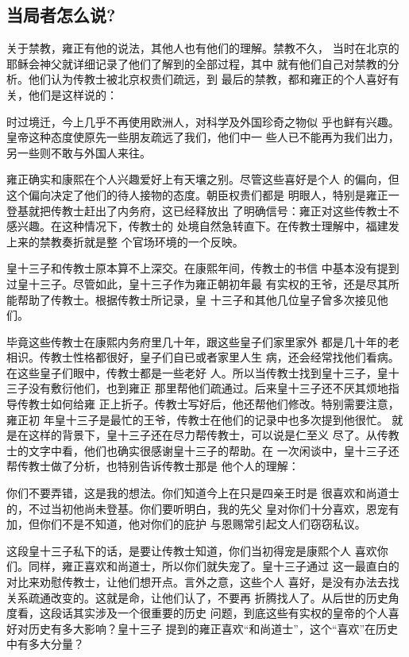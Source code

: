 \subsection{当局者怎么说?}
\par
关于禁教，雍正有他的说法，其他人也有他们的理解。禁教不久，%
当时在北京的耶稣会神父就详细记录了他们了解到的全部过程，其中%
就有他们自己对禁教的分析。他们认为传教士被北京权贵们疏远，到%
最后的禁教，都和雍正的个人喜好有关，他们是这样说的：%
\par
{\bookkai 时过境迁，今上几乎不再使用欧洲人，对科学及外国珍奇之物似}%
{\bookkai 乎也鲜有兴趣。皇帝这种态度使原先一些朋友疏远了我们，他们中一}%
{\bookkai 些人已不能再为我们出力，另一些则不敢与外国人来往。}{}%
\par
雍正确实和康熙在个人兴趣爱好上有天壤之别。尽管这些喜好是个人%
的偏向，但这个偏向决定了他们的待人接物的态度。朝臣权贵们都是%
明眼人，特别是雍正一登基就把传教士赶出了内务府，这已经释放出%
了明确信号：雍正对这些传教士不感兴趣。在这种情况下，传教士的%
处境自然急转直下。在传教士理解中，福建发上来的禁教奏折就是整%
个官场环境的一个反映。%
\par
皇十三子和传教士原本算不上深交。在康熙年间，传教士的书信%
中基本没有提到过皇十三子。尽管如此，皇十三子作为雍正朝初年最%
有实权的王爷，还是尽其所能帮助了传教士。根据传教士所记录，皇%
十三子和其他几位皇子曾多次接见他们。%
\par
毕竟这些传教士在康熙内务府里几十年，跟这些皇子们家里家外%
都是几十年的老相识。传教士性格都很好，皇子们自已或者家里人生%
病，还会经常找他们看病。在这些皇子们眼中，传教士都是一些老好%
人。所以当传教士找到皇十三子，皇十三子没有敷衍他们，也到雍正%
那里帮他们疏通过。后来皇十三子还不厌其烦地指导传教士如何给雍%
正上折子。传教士写好后，他还帮他们修改。特别需要注意，雍正初%
年皇十三子是最忙的王爷，传教士在他们的记录中也多次提到他很忙。%
就是在这样的背景下，皇十三子还在尽力帮传教士，可以说是仁至义%
尽了。从传教士的文字中看，他们也确实很感谢皇十三子的帮助。在%
一次闲谈中，皇十三子还帮传教士做了分析，也特别告诉传教士那是%
他个人的理解：%
\par
{\bookkai 你们不要弄错，这是我的想法。你们知道今上在只是四亲王时是}%
{\bookkai 很喜欢和尚道士的，不过当初他尚未登基。你们要听明白，我的先父}%
{\bookkai 皇对你们十分喜欢，恩宠有加，但你们不是不知道，他对你们的庇护}%
{\bookkai 与恩赐常引起文人们窃窃私议。}%
\par
这段皇十三子私下的话，是要让传教士知道，你们当初得宠是康熙个人%
喜欢你们。同样，雍正喜欢和尚道士，所以你们就失宠了。皇十三子通过%
这一最直白的对比来劝慰传教士，让他们想开点。言外之意，这些个人%
喜好，是没有办法去找关系疏通改变的。这就是命，让他们认了，不要再%
折腾找人了。从后世的历史角度看，这段话其实涉及一个很重要的历史%
问题，到底这些有实权的皇帝的个人喜好对历史有多大影响？皇十三子%
提到的雍正喜欢“和尚道士”，这个“喜欢”在历史中有多大分量？%
